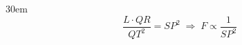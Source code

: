 \documentclass[border=4pt]{standalone}
\begin{document}
\begin{varwidth}{30em}
\large
\[ \dfrac{L \cdot QR}{QT^2} = SP^2 \;\Rightarrow\; F \propto \dfrac{1}{SP^2} \]

\end{varwidth}
\end{document}
